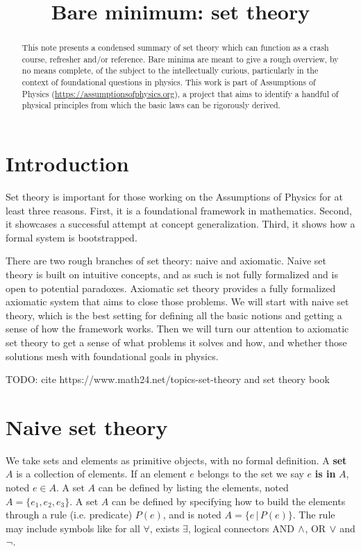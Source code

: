 \documentclass{article}
\title{Bare minimum: set theory}
\date{\vspace{-5ex}}
\begin{document}
\maketitle


\begin{abstract}
This note presents a condensed summary of set theory which can function as a crash course, refresher and/or reference. Bare minima are meant to give a rough overview, by no means complete, of the subject to the intellectually curious, particularly in the context of foundational questions in physics. This work is part of Assumptions of Physics (\url{https://assumptionsofphysics.org}), a project that aims to identify a handful of physical principles from which the basic laws can be rigorously derived.
\end{abstract}


\section{Introduction}

Set theory is important for those working on the Assumptions of Physics for at least three reasons. First, it is a foundational framework in mathematics. Second, it showcases a successful attempt at concept generalization. Third, it shows how a formal system is bootstrapped.

There are two rough branches of set theory: naive and axiomatic. Naive set theory is built on intuitive concepts, and as such is not fully formalized and is open to potential paradoxes. Axiomatic set theory provides a fully formalized axiomatic system that aims to close those problems. We will start with naive set theory, which is the best setting for defining all the basic notions and getting a sense of how the framework works. Then we will turn our attention to axiomatic set theory to get a sense of what problems it solves and how, and whether those solutions mesh with foundational goals  in physics.

TODO: cite https://www.math24.net/topics-set-theory and set theory book

\section{Naive set theory}

We take sets and elements as primitive objects, with no formal definition. A \textbf{set} $A$ is a collection of elements. If an element $e$ belongs to the set we say $e$ \textbf{is in} $A$, noted $ e 
\in A$. A set $A$ can be defined by listing the elements, noted $A = \{ e_1, e_2, e_3 \}$. A set $A$ can be defined by specifying how to build the elements through a rule (i.e. predicate) $P(e)$, and is noted $A = \{e \, | \,  P(e) \}$. The rule may include symbols like for all $\forall$, exists $\exists$, logical connectors AND $\wedge$, OR $\vee$ and $\neg$.
\end{document}
